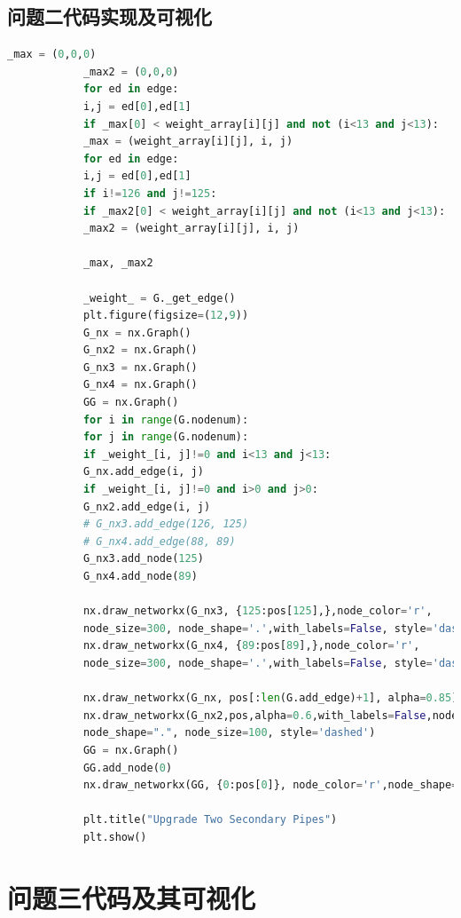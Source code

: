 \documentclass{whutmod}
\begin{document}
		\subsection*{问题二代码实现及可视化}
			\begin{lstlisting}[language=python]
			_max = (0,0,0)
			_max2 = (0,0,0)
			for ed in edge:
			i,j = ed[0],ed[1]
			if _max[0] < weight_array[i][j] and not (i<13 and j<13):
			_max = (weight_array[i][j], i, j)
			for ed in edge:
			i,j = ed[0],ed[1]
			if i!=126 and j!=125:
			if _max2[0] < weight_array[i][j] and not (i<13 and j<13):
			_max2 = (weight_array[i][j], i, j)
			
			_max, _max2
			
			_weight_ = G._get_edge()
			plt.figure(figsize=(12,9)) 
			G_nx = nx.Graph()
			G_nx2 = nx.Graph()
			G_nx3 = nx.Graph()
			G_nx4 = nx.Graph()
			GG = nx.Graph()
			for i in range(G.nodenum):
			for j in range(G.nodenum):
			if _weight_[i, j]!=0 and i<13 and j<13:
			G_nx.add_edge(i, j)
			if _weight_[i, j]!=0 and i>0 and j>0:
			G_nx2.add_edge(i, j)
			# G_nx3.add_edge(126, 125)
			# G_nx4.add_edge(88, 89)
			G_nx3.add_node(125)
			G_nx4.add_node(89)
			
			nx.draw_networkx(G_nx3, {125:pos[125],},node_color='r',
			node_size=300, node_shape='.',with_labels=False, style='dashed')
			nx.draw_networkx(G_nx4, {89:pos[89],},node_color='r',
			node_size=300, node_shape='.',with_labels=False, style='dashed')
			
			nx.draw_networkx(G_nx, pos[:len(G.add_edge)+1], alpha=0.85)
			nx.draw_networkx(G_nx2,pos,alpha=0.6,with_labels=False,node_color='slateblue',
			node_shape=".", node_size=100, style='dashed')
			GG = nx.Graph()
			GG.add_node(0)
			nx.draw_networkx(GG, {0:pos[0]}, node_color='r',node_shape='*', node_size=1200)
			
			plt.title("Upgrade Two Secondary Pipes")
			plt.show() 
			\end{lstlisting}
			
		\section{问题三代码及其可视化}
\end{document}
